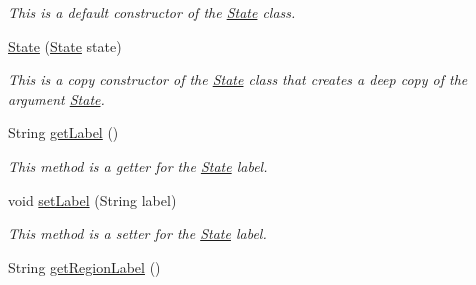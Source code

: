 \begin{DoxyCompactItemize}
\begin{DoxyCompactList}\small\item\em This is a default constructor of the \hyperlink{classese_1_1seas_1_1upenn_1_1edu_1_1_state}{State} class. \end{DoxyCompactList}\item 
\hypertarget{classese_1_1seas_1_1upenn_1_1edu_1_1_state_a69d1b48308a6edf25c382530b1fb0568}{}\hyperlink{classese_1_1seas_1_1upenn_1_1edu_1_1_state_a69d1b48308a6edf25c382530b1fb0568}{State} (\hyperlink{classese_1_1seas_1_1upenn_1_1edu_1_1_state}{State} state)\label{classese_1_1seas_1_1upenn_1_1edu_1_1_state_a69d1b48308a6edf25c382530b1fb0568}

\begin{DoxyCompactList}\small\item\em This is a copy constructor of the \hyperlink{classese_1_1seas_1_1upenn_1_1edu_1_1_state}{State} class that creates a deep copy of the argument \hyperlink{classese_1_1seas_1_1upenn_1_1edu_1_1_state}{State}. \end{DoxyCompactList}\item 
\hypertarget{classese_1_1seas_1_1upenn_1_1edu_1_1_state_a9f0ff2c851cc79f1f785939b4559de99}{}String \hyperlink{classese_1_1seas_1_1upenn_1_1edu_1_1_state_a9f0ff2c851cc79f1f785939b4559de99}{get\+Label} ()\label{classese_1_1seas_1_1upenn_1_1edu_1_1_state_a9f0ff2c851cc79f1f785939b4559de99}

\begin{DoxyCompactList}\small\item\em This method is a getter for the \hyperlink{classese_1_1seas_1_1upenn_1_1edu_1_1_state}{State} label. \end{DoxyCompactList}\item 
\hypertarget{classese_1_1seas_1_1upenn_1_1edu_1_1_state_a3f30d5f8386dbbb0e476d8340b473e12}{}void \hyperlink{classese_1_1seas_1_1upenn_1_1edu_1_1_state_a3f30d5f8386dbbb0e476d8340b473e12}{set\+Label} (String label)\label{classese_1_1seas_1_1upenn_1_1edu_1_1_state_a3f30d5f8386dbbb0e476d8340b473e12}

\begin{DoxyCompactList}\small\item\em This method is a setter for the \hyperlink{classese_1_1seas_1_1upenn_1_1edu_1_1_state}{State} label. \end{DoxyCompactList}\item 
\hypertarget{classese_1_1seas_1_1upenn_1_1edu_1_1_state_a54e81964af8ace7a52f049cb18b739a9}{}String \hyperlink{classese_1_1seas_1_1upenn_1_1edu_1_1_state_a54e81964af8ace7a52f049cb18b739a9}{get\+Region\+Label} ()\label{classese_1_1seas_1_1upenn_1_1edu_1_1_state_a54e81964af8ace7a52f049cb18b739a9}


\end{DoxyCompactItemize}
